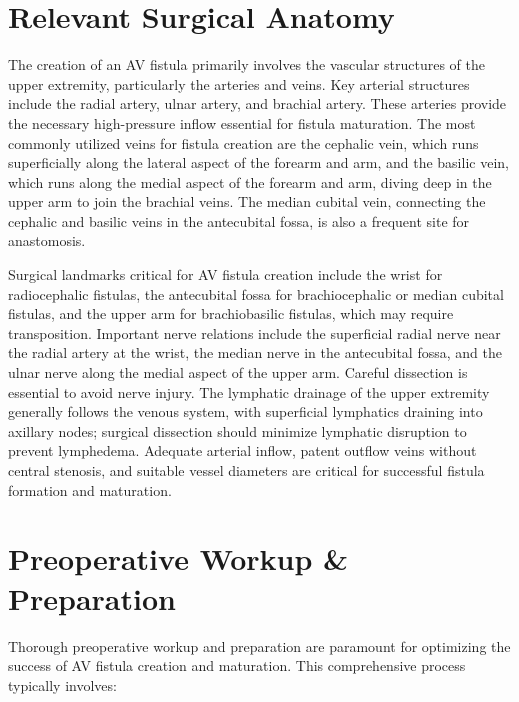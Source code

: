 \section*{Relevant Surgical Anatomy}
The creation of an AV fistula primarily involves the vascular structures of the upper extremity, particularly the arteries and veins. Key arterial structures include the radial artery, ulnar artery, and brachial artery. These arteries provide the necessary high-pressure inflow essential for fistula maturation. The most commonly utilized veins for fistula creation are the cephalic vein, which runs superficially along the lateral aspect of the forearm and arm, and the basilic vein, which runs along the medial aspect of the forearm and arm, diving deep in the upper arm to join the brachial veins. The median cubital vein, connecting the cephalic and basilic veins in the antecubital fossa, is also a frequent site for anastomosis.

Surgical landmarks critical for AV fistula creation include the wrist for radiocephalic fistulas, the antecubital fossa for brachiocephalic or median cubital fistulas, and the upper arm for brachiobasilic fistulas, which may require transposition. Important nerve relations include the superficial radial nerve near the radial artery at the wrist, the median nerve in the antecubital fossa, and the ulnar nerve along the medial aspect of the upper arm. Careful dissection is essential to avoid nerve injury. The lymphatic drainage of the upper extremity generally follows the venous system, with superficial lymphatics draining into axillary nodes; surgical dissection should minimize lymphatic disruption to prevent lymphedema. Adequate arterial inflow, patent outflow veins without central stenosis, and suitable vessel diameters are critical for successful fistula formation and maturation.

\section*{Preoperative Workup \& Preparation}
Thorough preoperative workup and preparation are paramount for optimizing the success of AV fistula creation and maturation. This comprehensive process typically involves:


